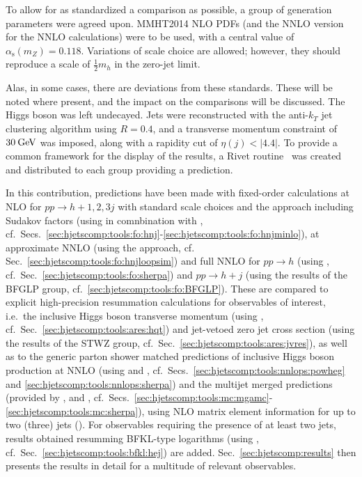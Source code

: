 To allow for as standardized a comparison as possible, a group of
generation parameters were agreed upon. MMHT2014 NLO PDFs (and the
NNLO version for the NNLO calculations) were to be used, with a
central value of $\alpha_\mathrm{s}(m_Z)=0.118$.  
Variations of scale choice are allowed; however, they
should reproduce a scale of $\tfrac{1}{2}m_h$ in the zero-jet limit.

Alas, in some cases, there are deviations from these standards. These
will be noted where present, and the impact on the comparisons will be
discussed.  The Higgs boson was left undecayed. Jets were reconstructed 
with the anti-$k_T$ jet clustering algorithm \cite{Cacciari:2008gp} using
$R=0.4$, and a transverse momentum constraint of $30\text{\:GeV}$ was imposed,
along with a rapidity cut of $\eta(j)<|4.4|$.  To provide a common
framework for the display of the results, a Rivet
routine~\cite{Buckley:2010ar,webpage} was created and distributed to each group
providing a prediction.

In this contribution, predictions have been made with fixed-order
calculations at NLO for $pp\to h+1,2,3j$ with standard scale choices 
and the \Minlo approach including Sudakov factors (using \GoSam in 
comnbination with \Sherpa, cf.\ Secs.\ 
\ref{sec:hjetscomp:tools:fo:hnj}-\ref{sec:hjetscomp:tools:fo:hnjminlo}), 
at approximate NNLO (using the \Loopsim approach, cf. Sec.\ 
\ref{sec:hjetscomp:tools:fo:hnjloopsim}) and full NNLO for $pp\to h$ 
(using \Sherpa, cf.\ Sec.\ \ref{sec:hjetscomp:tools:fo:sherpa}) and 
$pp\to h+j$ (using the results of the BFGLP group, cf.\ 
\ref{sec:hjetscomp:tools:fo:BFGLP}). These are compared to explicit 
high-precision resummation calculations for observables of interest, 
i.e.\ the inclusive Higgs boson transverse momentum (using \HqT, cf.\ 
Sec.\ \ref{sec:hjetscomp:tools:ares:hqt}) and jet-vetoed zero jet 
cross section (using the results of the STWZ group, cf.\ Sec.\ 
\ref{sec:hjetscomp:tools:ares:jvres}), as well as to the generic 
parton shower matched predictions of inclusive Higgs boson production 
at NNLO (using \Powheg and \Sherpa, cf.\ Secs.\ 
\ref{sec:hjetscomp:tools:nnlops:powheg} and 
\ref{sec:hjetscomp:tools:nnlops:sherpa}) and the multijet merged 
predictions (provided by \MGaMC, \Herwig and \Sherpa, cf.\ Secs.\ 
\ref{sec:hjetscomp:tools:mc:mgamc}-\ref{sec:hjetscomp:tools:mc:sherpa}), 
using NLO matrix element information for up to two (three) jets (\Sherpa). 
For observables requiring the presence of at least two jets, results 
obtained resumming BFKL-type logarithms (using \Hej, cf.\ Sec.\ 
\ref{sec:hjetscomp:tools:bfkl:hej}) are added. 
Sec.\ \ref{sec:hjetscomp:results} then presents the results in detail 
for a multitude of relevant observables.
